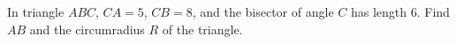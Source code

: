 In triangle $ABC$, $CA=5$, $CB=8$, and the bisector of angle $C$ has length $6$. Find $AB$ and the circumradius $R$ of the triangle.

